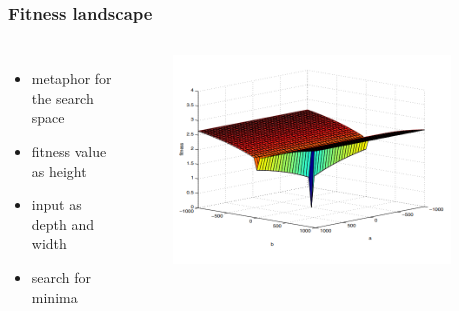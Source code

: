 \begin{frame}
	\frametitle{Fitness landscape}
	
	\begin{columns}[c]
		

		\begin{itemize}
			\item metaphor for the search space
			\item fitness value as height
			\item input as depth and width
			\item search for minima
		\end{itemize}
		
		\begin{figure}
			\includegraphics[width=1\textwidth]{figures/complex_landscape}
		\end{figure}
		\cite{Harman.2007}
		
	\end{columns}
	
\end{frame}


